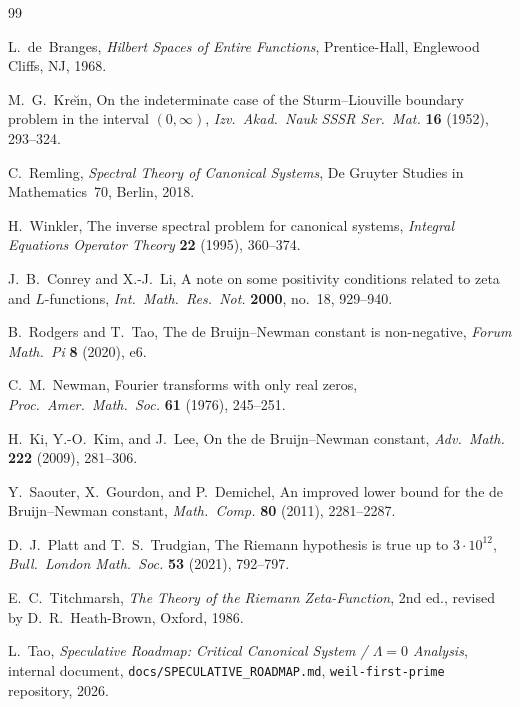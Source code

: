 \documentclass[12pt,a4paper]{amsart}
\theoremstyle{plain}
\theoremstyle{definition}
\begin{document}
\begin{thebibliography}{99}

L.~de~Branges,
\emph{Hilbert Spaces of Entire Functions},
Prentice-Hall, Englewood Cliffs, NJ, 1968.

M.~G.~Kre\u{\i}n,
On the indeterminate case of the Sturm--Liouville boundary problem in the
interval $(0,\infty)$,
\emph{Izv.\ Akad.\ Nauk SSSR Ser.\ Mat.} \textbf{16} (1952), 293--324.

C.~Remling,
\emph{Spectral Theory of Canonical Systems},
De Gruyter Studies in Mathematics~70, Berlin, 2018.

H.~Winkler,
The inverse spectral problem for canonical systems,
\emph{Integral Equations Operator Theory} \textbf{22} (1995), 360--374.

J.~B.~Conrey and X.-J.~Li,
A note on some positivity conditions related to zeta and $L$-functions,
\emph{Int.\ Math.\ Res.\ Not.} \textbf{2000}, no.~18, 929--940.

B.~Rodgers and T.~Tao,
The de Bruijn--Newman constant is non-negative,
\emph{Forum Math.\ Pi} \textbf{8} (2020), e6.

C.~M.~Newman,
Fourier transforms with only real zeros,
\emph{Proc.\ Amer.\ Math.\ Soc.} \textbf{61} (1976), 245--251.

H.~Ki, Y.-O.~Kim, and J.~Lee,
On the de Bruijn--Newman constant,
\emph{Adv.\ Math.} \textbf{222} (2009), 281--306.

Y.~Saouter, X.~Gourdon, and P.~Demichel,
An improved lower bound for the de Bruijn--Newman constant,
\emph{Math.\ Comp.} \textbf{80} (2011), 2281--2287.

D.~J.~Platt and T.~S.~Trudgian,
The Riemann hypothesis is true up to $3\cdot10^{12}$,
\emph{Bull.\ London Math.\ Soc.} \textbf{53} (2021), 792--797.

E.~C.~Titchmarsh,
\emph{The Theory of the Riemann Zeta-Function},
2nd ed., revised by D.~R.~Heath-Brown, Oxford, 1986.

L.~Tao,
\emph{Speculative Roadmap: Critical Canonical System / $\Lambda{=}0$
Analysis}, internal document,
\texttt{docs/SPECULATIVE\_ROADMAP.md},
\texttt{weil\allowbreak-first\allowbreak-prime} repository, 2026.

\end{thebibliography}
\end{document}
